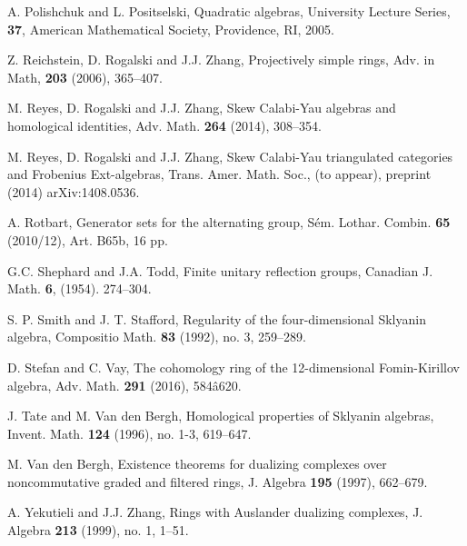 \begin{thebibliography}{10}
A. Polishchuk and L. Positselski, 
Quadratic algebras, 
University Lecture Series, 
{\bf 37}, American Mathematical Society, Providence, RI, 2005.

Z. Reichstein, D. Rogalski and J.J. Zhang, 
Projectively simple rings, 
Adv. in Math, {\bf 203} (2006), 365--407.

M. Reyes, D. Rogalski and J.J. Zhang,
Skew Calabi-Yau algebras and homological identities, 
Adv. Math. {\bf 264} (2014), 308--354.

M. Reyes, D. Rogalski and J.J. Zhang,
Skew Calabi-Yau triangulated categories and Frobenius Ext-algebras,
Trans. Amer. Math. Soc., (to appear), preprint (2014)
arXiv:1408.0536.

A. Rotbart, 
Generator sets for the alternating group, 
S{\'e}m. Lothar. Combin. {\bf 65} (2010/12), Art. B65b, 16 pp.

G.C. Shephard and J.A. Todd, Finite unitary reflection groups,
Canadian J. Math. {\bf 6}, (1954). 274--304.

S. P. Smith and J. T. Stafford, 
Regularity of the
four-dimensional Sklyanin algebra, 
Compositio Math. {\bf 83} (1992), no. 3, 259--289.

D. Stefan and C. Vay, 
The cohomology ring of the 12-dimensional Fomin-Kirillov algebra, 
Adv. Math. {\bf 291} (2016), 584â620. 

J. Tate and M. Van den Bergh, 
Homological properties of Sklyanin algebras, 
Invent. Math. {\bf 124} (1996), no. 1-3, 619--647.

M. Van den Bergh, 
Existence theorems for dualizing complexes over noncommutative 
graded and filtered rings, J. Algebra {\bf 195} (1997), 662--679.

 

A. Yekutieli and J.J. Zhang,
Rings with Auslander dualizing complexes,
J. Algebra {\bf 213} (1999), no. 1, 1--51.

\end{thebibliography}


